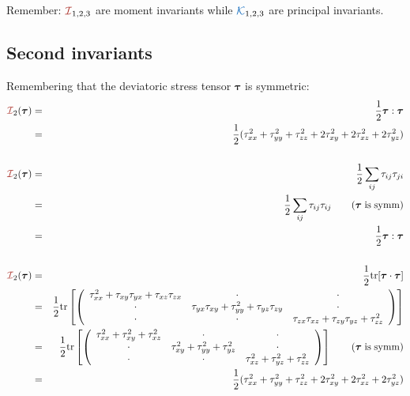 
Remember: ${\III}_{1,2,3}$ are moment invariants while
${\KKK}_{1,2,3}$ are principal invariants.


\subsection*{Second invariants}

Remembering that the deviatoric stress tensor ${\bm \tau}$ is symmetric:
\begin{eqnarray}
{\III}_2(\bm\tau) 
&=& \frac12 {\bm \tau}:{\bm \tau} \nn\\
&=& \frac12 ( \tau_{xx}^2 + \tau_{yy}^2 +\tau_{zz}^2 + 2\tau_{xy}^2+ 2\tau_{xz}^2+ 2\tau_{yz}^2) 
\nn\\
\nn\\
{\III}_2(\bm\tau) 
&=& \frac12 \sum_{ij} \tau_{ij}\tau_{ji}  \nn\\
&=& \frac12 \sum_{ij} \tau_{ij}\tau_{ij}  \qquad (\rm{\bm\tau \; is\; symm}) \nn\\
&=& \frac12 {\bm \tau}:{\bm \tau} 
\nn\\
\nn\\
{\III}_2(\bm\tau) 
&=& \frac12 {\rm tr} [{\bm \tau}\cdot {\bm \tau}] \nn\\
&=& \frac{1}{2}{\rm tr} 
\left[
\left(
\begin{array}{ccc}
\tau_{xx}^2 + \tau_{xy}\tau_{yx} + \tau_{xz}\tau_{zx} & \cdot & \cdot \\
\cdot & \tau_{yx}\tau_{xy} + \tau_{yy}^2  + \tau_{yz}\tau_{zy} & \cdot  \\
\cdot & \cdot & \tau_{zx}\tau_{xz} + \tau_{zy}\tau_{yz} + \tau_{zz}^2 
\end{array}
\right)
\right] \nn\\
&=& \frac{1}{2}{\rm tr} 
\left[
\left(
\begin{array}{ccc}
\tau_{xx}^2 + \tau_{xy}^2 + \tau_{xz}^2 & \cdot & \cdot \\
\cdot & \tau_{xy}^2 + \tau_{yy}^2  + \tau_{yz}^2 & \cdot  \\
\cdot & \cdot & \tau_{xz}^2 + \tau_{yz}^2 + \tau_{zz}^2 
\end{array}
\right)
\right] \qquad ( \rm {\bm\tau\;  is\; symm}) \nn\\
&=& \frac12 ( \tau_{xx}^2 + \tau_{yy}^2 +\tau_{zz}^2 + 2\tau_{xy}^2+ 2\tau_{xz}^2+ 2\tau_{yz}^2)
\end{eqnarray}


